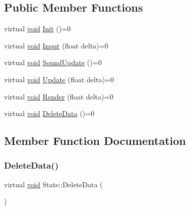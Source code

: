 \subsection*{Public Member Functions}
\begin{DoxyCompactItemize}
\item 
virtual \hyperlink{imgui__impl__opengl3__loader_8h_ac668e7cffd9e2e9cfee428b9b2f34fa7}{void} \hyperlink{classState_a7ab4d8c6aa239a17ed579d89a209b156}{Init} ()=0
\item 
virtual \hyperlink{imgui__impl__opengl3__loader_8h_ac668e7cffd9e2e9cfee428b9b2f34fa7}{void} \hyperlink{classState_a1705412877f37a5cc8fc712542756076}{Input} (float delta)=0
\item 
virtual \hyperlink{imgui__impl__opengl3__loader_8h_ac668e7cffd9e2e9cfee428b9b2f34fa7}{void} \hyperlink{classState_a6572089fbf2178bf5c582cc27d6d3925}{Sound\+Update} ()=0
\item 
virtual \hyperlink{imgui__impl__opengl3__loader_8h_ac668e7cffd9e2e9cfee428b9b2f34fa7}{void} \hyperlink{classState_aac0d3fdee1341e168af730b8f31a7bf1}{Update} (float delta)=0
\item 
virtual \hyperlink{imgui__impl__opengl3__loader_8h_ac668e7cffd9e2e9cfee428b9b2f34fa7}{void} \hyperlink{classState_a0e48dfae1e3090630475812681417c5f}{Render} (float delta)=0
\item 
virtual \hyperlink{imgui__impl__opengl3__loader_8h_ac668e7cffd9e2e9cfee428b9b2f34fa7}{void} \hyperlink{classState_ade502eaa386d570e526eb356ffd73fd8}{Delete\+Data} ()=0
\end{DoxyCompactItemize}


\subsection{Member Function Documentation}
\mbox{\label{classState_ade502eaa386d570e526eb356ffd73fd8}} 
\subsubsection{\texorpdfstring{Delete\+Data()}{DeleteData()}}
{\footnotesize\ttfamily virtual \hyperlink{imgui__impl__opengl3__loader_8h_ac668e7cffd9e2e9cfee428b9b2f34fa7}{void} State\+::\+Delete\+Data (\begin{DoxyParamCaption}{ }\end{DoxyParamCaption})\hspace{0.3cm}{\ttfamily [pure virtual]}}



